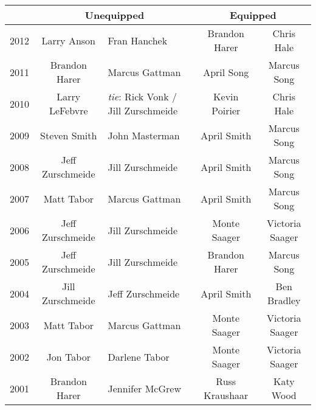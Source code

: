 \begin{tabular*}{5in}{ |c|c|p{1.25in}|c|c| }
  \hline
  \multicolumn{1}{|c|}{} &
  \multicolumn{2}{|c|}{Unequipped} &
  \multicolumn{2}{|c|}{Equipped} \\
  \hline
  2012 & Larry Anson & Fran Hanchek & Brandon Harer & Chris Hale \\
  \hline
  2011 & Brandon Harer & Marcus Gattman & April Song & Marcus Song \\
  \hline
  2010 & Larry LeFebvre & \textit{tie}: Rick Vonk / \newline
         Jill Zurschmeide & Kevin Poirier & Chris Hale \\
  \hline
  2009 & Steven Smith & John Masterman & April Smith & Marcus Song \\
  \hline
  2008 & Jeff Zurschmeide & Jill Zurschmeide & April Smith & Marcus Song \\
  \hline
  2007 & Matt Tabor & Marcus Gattman & April Smith & Marcus Song \\
  \hline
  2006 & Jeff Zurschmeide & Jill Zurschmeide & Monte Saager & Victoria Saager \\
  \hline
  2005 & Jeff Zurschmeide & Jill Zurschmeide & Brandon Harer & Marcus Song \\
  \hline
  2004 & Jill Zurschmeide & Jeff Zurschmeide & April Smith & Ben Bradley \\
  \hline
  2003 & Matt Tabor & Marcus Gattman & Monte Saager & Victoria Saager \\
  \hline
  2002 & Jon Tabor & Darlene Tabor & Monte Saager & Victoria Saager \\
  \hline
  2001 & Brandon Harer & Jennifer McGrew & Russ Kraushaar & Katy Wood \\
  \hline
\end{tabular*}